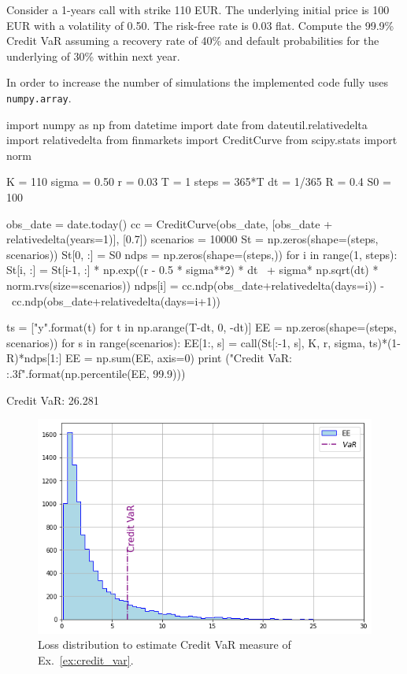 \begin{question}
\label{ex:credit_var}
Consider a 1-years call with strike 110 EUR. The underlying initial price is 100 EUR with a volatility of 0.50. The risk-free rate is 0.03 flat. Compute the 99.9\% Credit VaR assuming a recovery rate of 40\% and default probabilities for the underlying of 30\% within next year.
\end{question}

\cprotEnv\begin{solution}

In order to increase the number of simulations the implemented code fully uses \texttt{numpy.array}.

\begin{ipython}
import numpy as np
from datetime import date
from dateutil.relativedelta import relativedelta
from finmarkets import CreditCurve
from scipy.stats import norm


K = 110
sigma = 0.50
r = 0.03
T = 1
steps = 365*T
dt = 1/365
R = 0.4
S0 = 100

obs_date = date.today()
cc = CreditCurve(obs_date, [obs_date + relativedelta(years=1)], [0.7])
scenarios = 10000
St = np.zeros(shape=(steps, scenarios))
St[0, :] = S0
ndps = np.zeros(shape=(steps,))
for i in range(1, steps):
    St[i, :] = St[i-1, :] * np.exp((r - 0.5 * sigma**2) * dt \
                                   + sigma* np.sqrt(dt) * norm.rvs(size=scenarios))
    ndps[i] = cc.ndp(obs_date+relativedelta(days=i)) - \
        cc.ndp(obs_date+relativedelta(days=i+1))

ts = ["{}y".format(t) for t in np.arange(T-dt, 0, -dt)]
EE = np.zeros(shape=(steps, scenarios))
for s in range(scenarios):
    EE[1:, s] = call(St[:-1, s], K, r, sigma, ts)*(1-R)*ndps[1:]
EE = np.sum(EE, axis=0)
print ("Credit VaR: {:.3f}".format(np.percentile(EE, 99.9)))\end{ipython}
\begin{ioutput}
Credit VaR: 26.281
\end{ioutput}

\begin{figure}[htbp]
\centering
\includegraphics[width=0.7\linewidth]{figures/cr_var_ex}
\caption{Loss distribution to estimate Credit VaR measure of Ex.~\ref{ex:credit_var}.}
\end{figure}
\end{solution}





